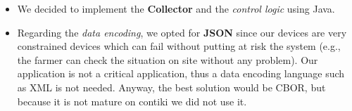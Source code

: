 \begin{itemize}
	\item We decided to implement the \textbf{Collector} and the \textit{control logic} using Java.
	\item Regarding the \textit{data encoding}, we opted for \textbf{JSON} since our devices are very constrained devices which can fail without putting at risk the system (e.g., the farmer can check the situation on site without any problem). Our application is not a critical application, thus a data encoding language such as XML is not needed. Anyway, the best solution would be CBOR, but because it is not mature on contiki we did not use it.
\end{itemize}